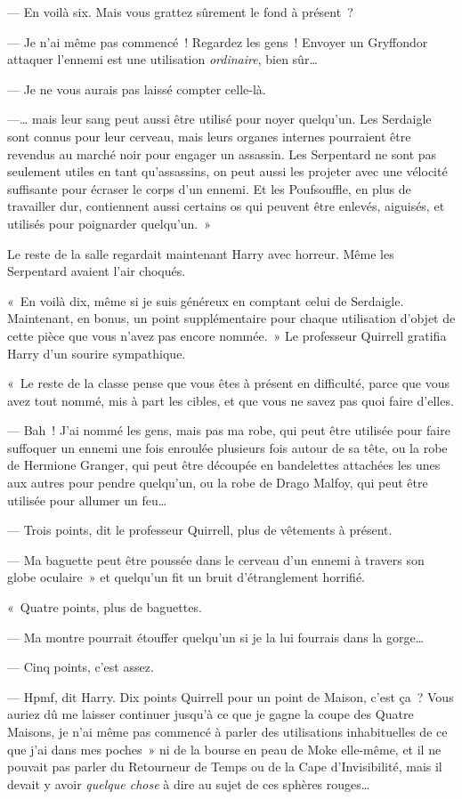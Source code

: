 --- En voilà six. Mais vous grattez sûrement le fond à présent~?

--- Je n'ai même pas commencé~! Regardez les gens~! Envoyer un Gryffondor attaquer l'ennemi est une utilisation \emph{ordinaire}, bien sûr…

--- Je ne vous aurais pas laissé compter celle-là.

---… mais leur sang peut aussi être utilisé pour noyer quelqu'un. Les Serdaigle sont connus pour leur cerveau, mais leurs organes internes pourraient être revendus au marché noir pour engager un assassin. Les Serpentard ne sont pas seulement utiles en tant qu'assassins, on peut aussi les projeter avec une vélocité suffisante pour écraser le corps d'un ennemi. Et les Poufsouffle, en plus de travailler dur, contiennent aussi certains os qui peuvent être enlevés, aiguisés, et utilisés pour poignarder quelqu'un.~»

Le reste de la salle regardait maintenant Harry avec horreur. Même les Serpentard avaient l'air choqués.

«~En voilà dix, même si je suis généreux en comptant celui de Serdaigle. Maintenant, en bonus, un point supplémentaire pour chaque utilisation d'objet de cette pièce que vous n'avez pas encore nommée.~» Le professeur Quirrell gratifia Harry d'un sourire sympathique.

«~Le reste de la classe pense que vous êtes à présent en difficulté, parce que vous avez tout nommé, mis à part les cibles, et que vous ne savez pas quoi faire d'elles.

--- Bah~! J'ai nommé les gens, mais pas ma robe, qui peut être utilisée pour faire suffoquer un ennemi une fois enroulée plusieurs fois autour de sa tête, ou la robe de Hermione Granger, qui peut être découpée en bandelettes attachées les unes aux autres pour pendre quelqu'un, ou la robe de Drago Malfoy, qui peut être utilisée pour allumer un feu…

--- Trois points, dit le professeur Quirrell, plus de vêtements à présent.

--- Ma baguette peut être poussée dans le cerveau d'un ennemi à travers son globe oculaire~» et quelqu'un fit un bruit d'étranglement horrifié.

«~Quatre points, plus de baguettes.

--- Ma montre pourrait étouffer quelqu'un si je la lui fourrais dans la gorge…

--- Cinq points, c'est assez.

--- Hpmf, dit Harry. Dix points Quirrell pour un point de Maison, c'est ça~? Vous auriez dû me laisser continuer jusqu'à ce que je gagne la coupe des Quatre Maisons, je n'ai même pas commencé à parler des utilisations inhabituelles de ce que j'ai dans mes poches~» ni de la bourse en peau de Moke elle-même, et il ne pouvait pas parler du Retourneur de Temps ou de la Cape d'Invisibilité, mais il devait y avoir \emph{quelque chose} à dire au sujet de ces sphères rouges…

